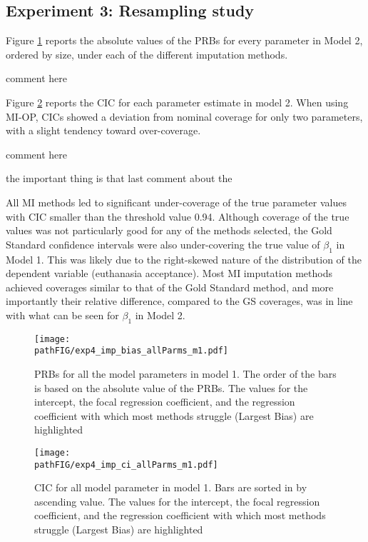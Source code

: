 \documentclass[]{./cls/interact}
\theoremstyle{plain}
\theoremstyle{definition}
\theoremstyle{remark}
\newcommand{\pathFIG}{./figures}
\begin{document}
\FloatBarrier

\subsection{Experiment 3: Resampling study}

	Figure \ref{fig:exp4_bias_allP} reports the absolute values of the PRBs for every parameter in Model 2, 
	ordered by size, under each of the different imputation methods.

	comment here

	Figure \ref{fig:exp4_ci_allP} reports the CIC for each parameter estimate in model 2.
	When using MI-OP, CICs showed a deviation from nominal coverage for only two parameters, with a slight 
	tendency toward over-coverage.

	comment here

	the important thing is that last comment about the 

	All MI methods led to significant under-coverage of the true parameter values with CIC smaller than the 
	threshold value 0.94.
	Although coverage of the true values was not particularly good for any of the methods selected, the Gold Standard
	confidence intervals were also under-covering the true value of $\beta_{1}$ in Model 1.
	This was likely due to the right-skewed nature of the distribution of the dependent variable (euthanasia 
	acceptance).
	Most MI imputation methods achieved coverages similar to that of the Gold Standard method, and more importantly 
	their relative difference, compared to the GS coverages, was in line with what can be seen for $\beta_{1}$ in Model 2.

\begin{figure}
	\centering
	\texttt{[image: \\pathFIG/exp4\_imp\_bias\_allParms\_m1.pdf]}
	\caption{PRBs for all the model parameters in model 1. 
		The order of the bars is based on the absolute value of the PRBs.
		The values for the intercept, the focal regression coefficient, and the regression coefficient with which most 
		methods struggle (Largest Bias) are highlighted}
	\label{fig:exp4_bias_allP}
\end{figure}

\begin{figure}
	\centering
	\texttt{[image: \\pathFIG/exp4\_imp\_ci\_allParms\_m1.pdf]}
	\caption{CIC for all model parameter in model 1.
		Bars are sorted in by ascending value.
		The values for the intercept, the focal regression coefficient, and the regression coefficient with which most 
		methods struggle (Largest Bias) are highlighted}
	\label{fig:exp4_ci_allP}
\end{figure}
\end{document}
